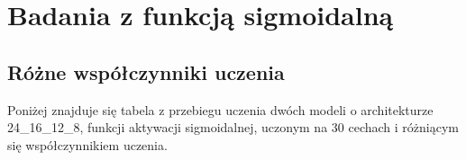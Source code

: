     \vspace{2em}

    \section{Badania z funkcją sigmoidalną}\label{sec:badaniaZFunkcjąSigmoid}

    \subsection{Różne współczynniki uczenia}\label{subsec:różneWspólczynnikiUczenia}

    Poniżej znajduje się tabela z przebiegu uczenia dwóch modeli o architekturze 24\_16\_12\_8, funkcji aktywacji sigmoidalnej, uczonym na 30 cechach i różniącym się współczynnikiem uczenia.

